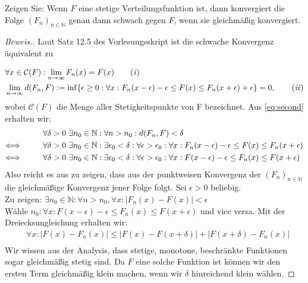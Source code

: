 \begin{lemma}
    Zeigen Sie: Wenn $F$ eine stetige Verteilungsfunktion ist, dann konvergiert die Folge $(F_n)_{n \in \mathbb{N}}$ genau dann
    schwach gegen $F$, wenn sie gleichmäßig konvergiert.
\end{lemma}
\begin{proof}[Beweis.]
    Laut Satz 12.5 des Vorlesungsskript ist die schwache Konvergenz äquivalent zu

    \begin{align*}
    &\forall x \in \mathcal{C}(F): \lim_{n \rightarrow \infty} F_n(x) = F(x) \tag{\textit{i}} \label{eq:first} \\
    &\lim_{n \rightarrow \infty} d(F_n,F) := \inf \{\epsilon \geq 0: \forall x: F_n(x - \epsilon) - \epsilon \leq F(x) \leq F_n(x + \epsilon) + \epsilon\} = 0, \tag{\textit{ii}} \label{eq:second} \\
\end{align*}
    wobei $\mathcal{C}(F)$ die Menge aller Stetigkeitspunkte von F bezeichnet.
    Aus \ref{eq:second} erhalten wir:
\begin{align*}
    &\forall \delta > 0~ \exists n_0 \in \mathbb{N}: \forall n > n_0: d(F_n,F) < \delta\\
    \Longleftrightarrow \hspace{10mm} &\forall \delta > 0~ \exists n_0 \in \mathbb{N}: \exists \epsilon_0 < \delta: \forall \epsilon > \epsilon_0: \forall x: F_n(x - \epsilon) - \epsilon \leq F(x) \leq F_n(x + \epsilon) \\
    \Longleftrightarrow \hspace{10mm} &\forall \delta > 0~ \exists n_0 \in \mathbb{N}: \exists \epsilon_0 < \delta: \forall \epsilon > \epsilon_0: \forall x: F(x - \epsilon) - \epsilon \leq F_n(x) \leq F(x + \epsilon) \\
\end{align*}
Also reicht es aus zu zeigen, dass aus der punktweisen Konvergenz der $(F_n)_{n \in \mathbb{N}}$ die gleichmäßige Konvergenz jener Folge folgt.
Sei $\epsilon > 0$ beliebig. \\
Zu zeigen: $\exists n_0 \in \mathbb{N}: \forall n > n_0, \forall x: | F_n(x) - F(x) | < \epsilon $\\
Wähle $n_0: \forall x: F(x - \epsilon) - \epsilon \leq F_n(x) \leq F(x + \epsilon) $ und vice versa.
Mit der Dreiecksungleichung erhalten wir:
\begin{align*}
  &\forall x: | F(x) - F_n(x)| \leq | F(x) - F(x + \delta) | + | F(x + \delta) - F_n(x) | \\
\end{align*}
Wir wissen aus der Analysis, dass stetige, monotone, beschränkte Funktionen sogar gleichmäßig stetig sind. Da $F$ eine solche Funktion ist können wir den ersten Term gleichmäßig klein machen, wenn wir $\delta$ hinreichend klein wählen.


\end{proof}

